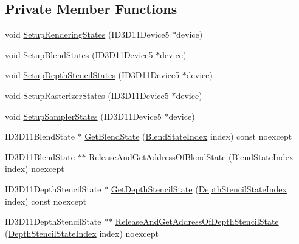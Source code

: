 \subsection*{Private Member Functions}
\begin{DoxyCompactItemize}
\item 
void \hyperlink{classmage_1_1_rendering_state_manager_a552a7dcc8e932ebee1fc3256411cbd51}{Setup\+Rendering\+States} (I\+D3\+D11\+Device5 $\ast$device)
\item 
void \hyperlink{classmage_1_1_rendering_state_manager_a9c3df1b125b1348ef0a901bc196ab740}{Setup\+Blend\+States} (I\+D3\+D11\+Device5 $\ast$device)
\item 
void \hyperlink{classmage_1_1_rendering_state_manager_a69fd22d63b9019e1bc2ebd811d7e39a8}{Setup\+Depth\+Stencil\+States} (I\+D3\+D11\+Device5 $\ast$device)
\item 
void \hyperlink{classmage_1_1_rendering_state_manager_a74e37deb853254b87a0f61af178ad703}{Setup\+Rasterizer\+States} (I\+D3\+D11\+Device5 $\ast$device)
\item 
void \hyperlink{classmage_1_1_rendering_state_manager_ae567fc70128f8fa58b2ac0b63b0c636f}{Setup\+Sampler\+States} (I\+D3\+D11\+Device5 $\ast$device)
\item 
I\+D3\+D11\+Blend\+State $\ast$ \hyperlink{classmage_1_1_rendering_state_manager_a09dc8e15d98269b1b9c5f9bb71c647b4}{Get\+Blend\+State} (\hyperlink{classmage_1_1_rendering_state_manager_ae8ea18eb352ae4cf9e23b41f10578984}{Blend\+State\+Index} index) const noexcept
\item 
I\+D3\+D11\+Blend\+State $\ast$$\ast$ \hyperlink{classmage_1_1_rendering_state_manager_ad7626daab9a488a34ab50df3768d5bc9}{Release\+And\+Get\+Address\+Of\+Blend\+State} (\hyperlink{classmage_1_1_rendering_state_manager_ae8ea18eb352ae4cf9e23b41f10578984}{Blend\+State\+Index} index) noexcept
\item 
I\+D3\+D11\+Depth\+Stencil\+State $\ast$ \hyperlink{classmage_1_1_rendering_state_manager_aabd3a4bec099f0325c238bdfa43cbc88}{Get\+Depth\+Stencil\+State} (\hyperlink{classmage_1_1_rendering_state_manager_abcfd0e984d2ba2710320882430d6871a}{Depth\+Stencil\+State\+Index} index) const noexcept
\item 
I\+D3\+D11\+Depth\+Stencil\+State $\ast$$\ast$ \hyperlink{classmage_1_1_rendering_state_manager_a2387df8ca417a4e743551e9a59af19de}{Release\+And\+Get\+Address\+Of\+Depth\+Stencil\+State} (\hyperlink{classmage_1_1_rendering_state_manager_abcfd0e984d2ba2710320882430d6871a}{Depth\+Stencil\+State\+Index} index) noexcept
\item 

\end{DoxyCompactItemize}
